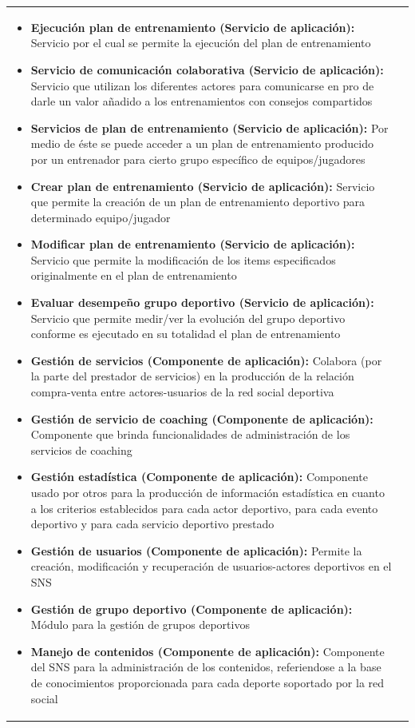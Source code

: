 \begin{table}[!htb]
\begin{center}
{\begin{tabular}{|p{7cm}|p{4cm}|}
\begin{itemize}
				\item \textbf{Ejecución plan de entrenamiento (Servicio de aplicación):} Servicio por el cual se permite la ejecución del plan de entrenamiento
				\item \textbf{Servicio de comunicación colaborativa (Servicio de aplicación):} Servicio que utilizan los diferentes actores para comunicarse en pro de darle un valor añadido a los entrenamientos con consejos compartidos
				\item \textbf{Servicios de plan de entrenamiento (Servicio de aplicación):} Por medio de éste se puede acceder a un plan de entrenamiento producido por un entrenador para cierto grupo específico de equipos/jugadores
				\item \textbf{Crear plan de entrenamiento (Servicio de aplicación):} Servicio que permite la creación de un plan de entrenamiento deportivo para determinado equipo/jugador
				\item \textbf{Modificar plan de entrenamiento (Servicio de aplicación):} Servicio que permite la modificación de los items especificados originalmente en el plan de entrenamiento
				\item \textbf{Evaluar desempeño grupo deportivo (Servicio de aplicación):} Servicio que permite medir/ver la evolución del grupo deportivo conforme es ejecutado en su totalidad el plan de entrenamiento
				\item \textbf{Gestión de servicios (Componente de aplicación):} Colabora (por la parte del prestador de servicios) en la producción de la relación compra-venta entre actores-usuarios de la red social deportiva
				\item \textbf{Gestión de servicio de coaching (Componente de aplicación):} Componente que brinda funcionalidades de administración de los servicios de coaching
				\item \textbf{Gestión estadística (Componente de aplicación):} Componente usado por otros para la producción de información estadística en cuanto a los criterios establecidos para cada actor deportivo, para cada evento deportivo y para cada servicio deportivo prestado
				\item \textbf{Gestión de usuarios (Componente de aplicación):} Permite la creación, modificación y recuperación de usuarios-actores deportivos en el SNS
				\item \textbf{Gestión de grupo deportivo (Componente de aplicación):} Módulo para la gestión de grupos deportivos
				\item \textbf{Manejo de contenidos (Componente de aplicación):} Componente del SNS para la administración de los contenidos, referiendose a la base de conocimientos proporcionada para cada deporte soportado por la red social

\end{itemize}
\end{tabular}}
\end{center}
\end{table}
